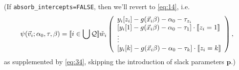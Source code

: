 \documentclass{article}
\DeclarePairedDelimiter{\indicator}{\llbracket}{\rrbracket}
\newcommand{\owt}[1][{[z_{i}]}]{\ensuremath{\check{w}_{i#1}}}
\begin{document}
(If \texttt{absorb\_intercepts=FALSE}, then we'll revert to \eqref{eq:14}, i.e.
\begin{equation*}
         \psi(\vec{v}_{i};
  \alpha_{0}, \tau, \beta) = \indicator{i \in \bigcup \mathcal{Q}}\owt[]
         \left( \begin{array}{l}
           y_{i}[z_{i}] - g(\vec{x}_{i}\beta)-
                  \alpha_0 - \tau_{z_{i}}\\
           {}[y_{i}[1] - g(\vec{x}_{i}\beta)-
                  \alpha_0-\tau_{1}]\cdot \indicator{z_{i}=1}\\
                  \vdots \\
           {}[y_{i}[k] - g(\vec{x}_{i}\beta)-
                 \alpha_0 - \tau_{k}]\cdot \indicator{z_{i}=k}\\%
                \end{array}\right),
\end{equation*}
as supplemented by \eqref{eq:34}, skipping the introduction of slack parameters $\mathbf{p}$.)
\end{document}
